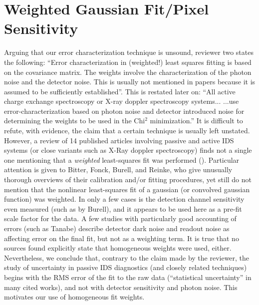 \documentclass[]{AIAA}
\begin{document}
\section{Weighted Gaussian Fit/Pixel Sensitivity}
\hspace{4ex}Arguing that our error characterization technique is unsound, reviewer two states the following: ``Error characterization in (weighted!) least squares fitting is based on the covariance matrix. The weights involve the characterization of the photon noise and the detector noise. This is usually not mentioned in papers because it is assumed to be sufficiently established''. This is restated later on: ``All active charge exchange spectroscopy or X-ray doppler spectroscopy systems...  ...use error-characterization based on photon noise and detector introduced noise for determining the weights to be used in the Chi$^2$ minimization.'' It is difficult to refute, with evidence, the claim that a certain technique is usually left unstated. However, a review of 14 published articles involving passive and active IDS systems (or close variants such as X-Ray doppler spectroscopy) finds not a single one mentioning that a \textit{weighted} least-squares fit was performed (\cite{schorn1992}\cite{tanabe2013}\cite{hutchinson2000}\cite{burrell1980}\cite{bitter1979}\cite{khachan2001}\cite{gu2004}\cite{groebner1983}\cite{Reinke}\cite{rapisarda2007role}\cite{bamford1992combination}\cite{Baciero2001JT-II}\cite{den1994fast}\cite{cothran2006fast}). Particular attention is given to Bitter\cite{bitter1979}, Fonck\cite{fonck1984determination}, Burell\cite{burrell1980}, and Reinke\cite{Reinke}, who give unusually thorough overviews of their calibration and/or fitting procedures, yet still do not mention that the nonlinear least-squares fit of a gaussian (or convolved gaussian function) was weighted. In only a few cases is the detection channel sensitivity even measured (such as by Burell\cite{burrell1980}), and it appears to be used here as a pre-fit scale factor for the data. A few studies with particularly good accounting of errors (such as Tanabe\cite{tanabe2013}) describe detector dark noise and readout noise as affecting error on the final fit, but not as a weighting term. It is true that no sources found explicitly state that  homogeneous weights were used, either. Nevertheless, we conclude that, contrary to the claim made by the reviewer, the study of uncertainty in passive IDS diagnostics (and closely related techniques) begins with the RMS error of the fit to the raw data (``statistical uncertainty'' in many cited works), and not with detector sensitivity and photon noise. This motivates our use of homogeneous fit weights.\\
\end{document}
